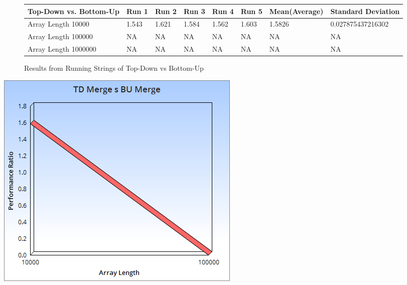 \documentclass{article}
\begin{document}
\begin{figure}[H]
\centering
\begin{adjustwidth}{-3.4cm}{}
\begin{tabular}{| l | l | l | l | l | l | l | l |}
\hline
Top-Down vs. Bottom-Up& Run 1 & Run 2 & Run 3 & Run 4 & Run 5 & Mean(Average) & Standard Deviation\\ \hline
Array Length 10000 & 1.543 & 1.621 & 1.584 & 1.562 & 1.603 & 1.5826 & 0.027875437216302  \\ \hline
Array Length 100000 & NA & NA& NA & NA & NA & NA & NA \\ \hline
Array Length 1000000 & NA & NA & NA & NA & NA & NA & NA \\ \hline
\end{tabular}
\caption{Results from Running  Strings of Top-Down vs Bottom-Up}
\end{adjustwidth}
\end{figure}
\includegraphics[scale=0.5]{String4.png}
\end{document}
